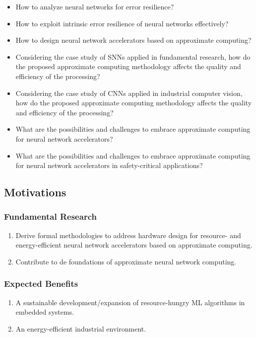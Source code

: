\begin{itemize}
\item How to analyze neural networks for error resilience?
\item How to exploit intrinsic error resilience of neural networks effectively?
\item How to design neural network accelerators based on approximate computing?
\item Considering the case study of SNNs applied in fundamental research, how do the proposed approximate computing methodology affects the quality and efficiency of the processing?
\item Considering the case study of CNNs applied in industrial computer vision, how do the proposed approximate computing methodology affects the quality and efficiency of the processing?
\item What are the possibilities and challenges to embrace approximate computing for neural network accelerators?
\item What are the possibilities and challenges to embrace approximate computing for neural network accelerators in safety-critical applications?

\end{itemize}

\subsection{Motivations}

\subsubsection{Fundamental Research}
\begin{enumerate}
	\item Derive formal methodologies to address hardware design for resource- and energy-efficient neural network accelerators based on approximate computing.
	\item Contribute to de foundations of approximate neural network computing.
\end{enumerate}

\subsubsection{Expected Benefits}
\begin{enumerate}
	\item A sustainable development/expansion of resource-hungry ML algorithms in embedded systems.
	\item An energy-efficient industrial environment.
\end{enumerate}













